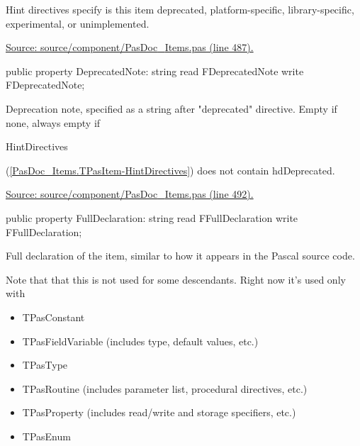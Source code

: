 \documentclass{report}
\newif\ifpdf
\begin{document}
\begin{list}{}
\begin{flushleft}
\ifpdf
\end{flushleft}
\fi


\par Hint directives specify is this item deprecated, platform{-}specific, library{-}specific, experimental, or unimplemented.\par
\href{https://github.com/pasdoc/pasdoc/blob/master/source/component/PasDoc_Items.pas#L487}{Source: source/component/PasDoc{\_}Items.pas (line 487).}\label{PasDoc_Items.TPasItem-DeprecatedNote}
\item[\textbf{DeprecatedNote}\hfill]
\ifpdf
\begin{flushleft}
\fi
\begin{ttfamily}
public property DeprecatedNote: string
      read FDeprecatedNote write FDeprecatedNote;\end{ttfamily}

\ifpdf
\end{flushleft}
\fi


\par Deprecation note, specified as a string after "deprecated" directive. Empty if none, always empty if \begin{ttfamily}HintDirectives\end{ttfamily}(\ref{PasDoc_Items.TPasItem-HintDirectives}) does not contain hdDeprecated.\par
\href{https://github.com/pasdoc/pasdoc/blob/master/source/component/PasDoc_Items.pas#L492}{Source: source/component/PasDoc{\_}Items.pas (line 492).}\label{PasDoc_Items.TPasItem-FullDeclaration}
\item[\textbf{FullDeclaration}\hfill]
\ifpdf
\begin{flushleft}
\fi
\begin{ttfamily}
public property FullDeclaration: string read FFullDeclaration write FFullDeclaration;\end{ttfamily}

\ifpdf
\end{flushleft}
\fi


\par Full declaration of the item, similar to how it appears in the Pascal source code.

Note that that this is not used for some descendants. Right now it's used only with

\begin{itemize}
\item TPasConstant
\item TPasFieldVariable (includes type, default values, etc.)
\item TPasType
\item TPasRoutine (includes parameter list, procedural directives, etc.)
\item TPasProperty (includes read/write and storage specifiers, etc.)
\item TPasEnum


\end{itemize}
\end{list}
\end{document}
